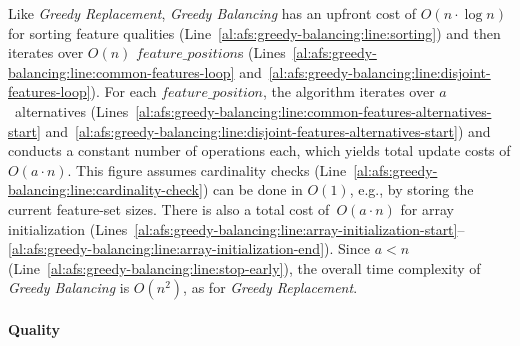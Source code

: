 \documentclass{article}
\theoremstyle{definition}
\begin{document}
Like \emph{Greedy Replacement}, \emph{Greedy Balancing} has an upfront cost of $O(n \cdot \log n)$ for sorting feature qualities (Line~\ref{al:afs:greedy-balancing:line:sorting}) and then iterates over $O(n)$ $\mathit{feature\_position}$s (Lines~\ref{al:afs:greedy-balancing:line:common-features-loop} and~\ref{al:afs:greedy-balancing:line:disjoint-features-loop}).
For each $\mathit{feature\_position}$, the algorithm iterates over $a$~alternatives (Lines~\ref{al:afs:greedy-balancing:line:common-features-alternatives-start} and~\ref{al:afs:greedy-balancing:line:disjoint-features-alternatives-start}) and conducts a constant number of operations each, which yields total update costs of $O(a \cdot n)$.
This figure assumes cardinality checks (Line~\ref{al:afs:greedy-balancing:line:cardinality-check}) can be done in $O(1)$, e.g., by storing the current feature-set sizes.
There is also a total cost of~$O(a \cdot n)$ for array initialization (Lines~\ref{al:afs:greedy-balancing:line:array-initialization-start}--\ref{al:afs:greedy-balancing:line:array-initialization-end}).
Since $a < n$ (Line~\ref{al:afs:greedy-balancing:line:stop-early}), the overall time complexity of \emph{Greedy Balancing} is $O(n^2)$, as for \emph{Greedy Replacement}.

\paragraph{Quality}
\end{document}
